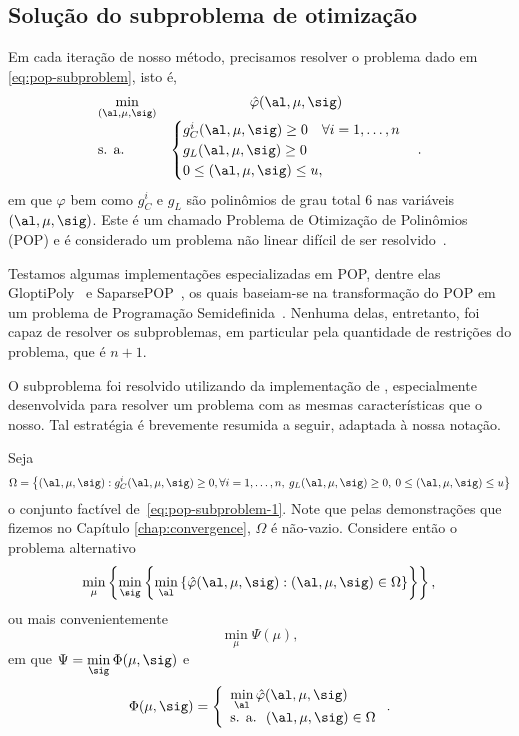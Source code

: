 \subsection{Solução do subproblema de otimização}

Em cada iteração de nosso método, precisamos resolver o problema dado em \eqref{eq:pop-subproblem}, isto é, 
\begin{equation}
	\label{eq:pop-subproblem-1}
	\begin{array}{lc}
\displaystyle \min_{(\al,\mu,\sig)} & \hat\varphi(\al,\mu,\sig) \\
\text{s. a.} &\begin{cases} g_C^i(\al,\mu,\sig) \geq 0 \quad \forall i = 1,\ldots,n \\
				g_L(\al,\mu,\sig)   \geq 0 	\\
				 0\leq (\al,\mu,\sig) \leq u,
				 	
				 \end{cases}.
\end{array}
\end{equation}
em que $\varphi$ bem como $g_{C}^{i}$ e $g_{L}$ são polinômios de grau total 6 nas variáveis $(\al,\mu,\sig)$. Este é um chamado Problema de Otimização de Polinômios (POP) e é considerado um problema não linear  difícil de ser resolvido~\cite{Laurent:2010kp}.

Testamos algumas  implementações especializadas em POP, dentre elas GloptiPoly~\cite{Henrion:2009eb} e SaparsePOP~\cite{Waki:2008ie}, os quais baseiam-se na transformação do POP em um problema de Programação Semidefinida~\cite{Lasserre:2001fw}. Nenhuma delas, entretanto, foi capaz de resolver os subproblemas, em particular pela quantidade de restrições do problema, que é  $n+1$.  


O subproblema foi resolvido utilizando da implementação de \textcite{VillasBoas:2012ur,VillasBoas2013:wn}, especialmente desenvolvida para resolver um problema com as mesmas características que o nosso.  Tal estratégia é brevemente resumida a seguir, adaptada à nossa notação.

Seja
\[\Omega = \left\{(\al,\mu,\sig): g_C^i(\al,\mu,\sig) \geq0, \forall i = 1,\ldots,n,\: g_L(\al,\mu,\sig)   \geq 0,\:		 0\leq (\al,\mu,\sig) \leq u\right\}\]
o conjunto factível de~\eqref{eq:pop-subproblem-1}. Note que pelas demonstrações que fizemos no Capítulo \ref{chap:convergence}, $\Omega$ é não-vazio. Considere então o problema alternativo
\begin{equation}
		\label{eq:pop-subproblem-2}
\displaystyle  \min_{\mu}\left\{  \min_{\sig} \left\{ \min_{\al} \left\{ \nextphi(\al,\mu,\sig):    (\al,\mu,\sig) \in \Omega  \right\} \right\}\right\}, \\
\end{equation}
ou mais convenientemente 
\[
\displaystyle \min_{\mu}\Psi(\mu),
\]
em que  $\displaystyle \Psi = \min_{\sig}\Phi(\mu,\sig)$ e 
\[
\Phi(\mu,\sig) = \left\{
	\begin{array}{l}
\displaystyle \min_{\al}  \nextphi(\al,\mu,\sig) \\
\text{s. a. }\:  (\al,\mu,\sig) \in\Omega
\end{array}\right..
\]
  
